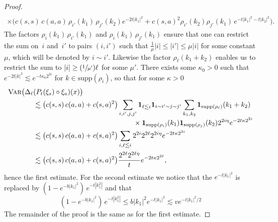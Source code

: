 \documentclass[10pt]{amsart}
\newcommand{\Psfrac}[2]{(\sfrac{#1}{#2})}
\theoremstyle{definition}
\newcommand{\bfone}{\mathbf{1}}
\begin{document}
\begin{proof}
\begin{multline*}
\\
\times\bigl( c(s,s) \, c(a,a) \, \rho_{i'}(k_1) \, \rho_{j'}(k_2)e^{-2t|k_1|^2} + c(s,a)^2\rho_{i'}(k_2)\rho_{j'}(k_1) \, e^{-t|k_1|^2-t|k_2|^2} \bigr).
\end{multline*}
The factors $ \rho_i(k_1)\,\rho_{i'}(k_1)$ and $\rho_i(k_1)\,\rho_{j'}(k_1) $ ensure that one can restrict the sum on~$i$ and~$i'$ to pairs $(i,i')$ such that $\frac{1}{\mu}|i|\leq |i'| \leq \mu |i|$ for some constant $\mu$, which will be denoted by $i\sim i'$. Likewise the factor $\rho_\ell(k_1+k_2)$ enables us to restrict the sum to $|i|\geq \Psfrac{1}{\mu'}\ell$ for some $\mu'$. There exists some $\kappa_0>0$ such that $e^{-2t|k|^2}\lesssim e^{-t\kappa_0 2^{2i}}$ for $k\in\text{supp}(\rho_i)$, so that for some $\kappa>0$
\begin{align*}
\textsc{{Var}}\bigl(\Delta_\ell&(P_t(\xi_s)\circ\xi_a)(x)\bigr)
\\
&\lesssim \bigl(c(s,s)\,c(a,a) + c(s,a)^2\bigr) \sum_{i,i',j,j'} \bfone_{\ell\lesssim i}\bfone_{i\sim i' \sim j \sim j'} \sum_{k_1,k_2} \bfone_{\text{supp}(\rho_\ell)}(k_1+k_2) \\[-3pt]
&\hspace*{5cm} \times \bfone_{\text{supp}(\rho_i)}(k_1)\bfone_{\text{supp}(\rho_j)}(k_2)2^{2i\eta} e^{-2t\kappa 2^{2i}}
\\
&\lesssim \bigl(c(s,s)\,c(a,a) + c(s,a)^2\bigr) \sum_{i, \ell\lesssim i}2^{2i}2^{2\ell}2^{2i\eta}e^{-2t\kappa 2^{2i}} \
\\
&\lesssim \bigl(c(s,s) \, c(a,a) + c(s,a)^2\bigr) \frac{2^{2\ell}2^{2\ell\eta}}{t}e^{-2t\kappa 2^{2\ell}},
\end{align*}
hence the first estimate. For the second estimate we notice that the $e^{-t|k_1|^2}$ is replaced by $(1-e^{-b|k_1|^2})\,e^{-t|k_1^2|}$ and that
\[
(1-e^{-b|k_1|^2}) \, e^{-t|k_1^2|}\leq b|k_1|^2 e^{-t|k_1|^2} \lesssim v e^{-t |k_1|^2/2}
\]
The remainder of the proof is the same as for the first estimate.
\end{proof}
\end{document}
